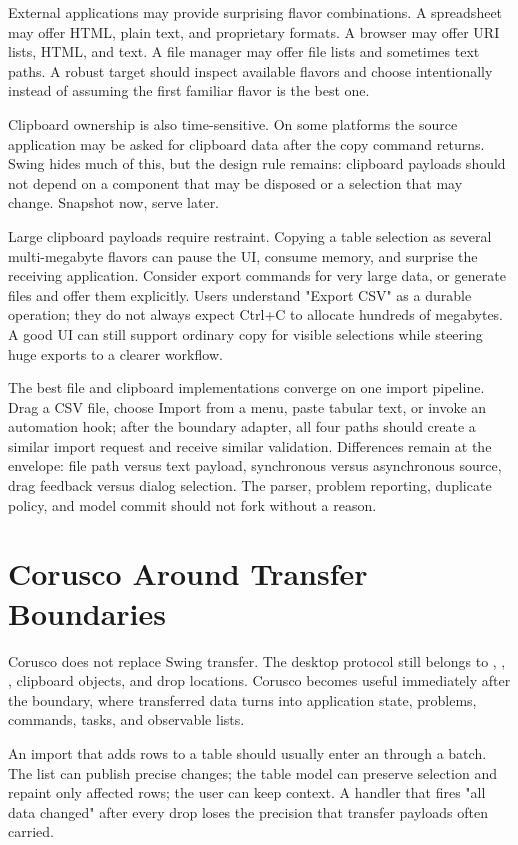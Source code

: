 External applications may provide surprising flavor combinations. A spreadsheet may offer HTML, plain text, and proprietary formats. A browser may offer URI lists, HTML, and text. A file manager may offer file lists and sometimes text paths. A robust target should inspect available flavors and choose intentionally instead of assuming the first familiar flavor is the best one.

Clipboard ownership is also time-sensitive. On some platforms the source application may be asked for clipboard data after the copy command returns. Swing hides much of this, but the design rule remains: clipboard payloads should not depend on a component that may be disposed or a selection that may change. Snapshot now, serve later.

Large clipboard payloads require restraint. Copying a table selection as several multi-megabyte flavors can pause the UI, consume memory, and surprise the receiving application. Consider export commands for very large data, or generate files and offer them explicitly. Users understand "Export CSV" as a durable operation; they do not always expect Ctrl+C to allocate hundreds of megabytes. A good UI can still support ordinary copy for visible selections while steering huge exports to a clearer workflow.

The best file and clipboard implementations converge on one import pipeline. Drag a CSV file, choose Import from a menu, paste tabular text, or invoke an automation hook; after the boundary adapter, all four paths should create a similar import request and receive similar validation. Differences remain at the envelope: file path versus text payload, synchronous versus asynchronous source, drag feedback versus dialog selection. The parser, problem reporting, duplicate policy, and model commit should not fork without a reason.

\section{Corusco Around Transfer Boundaries}

Corusco does not replace Swing transfer. The desktop protocol still belongs to , , , clipboard objects, and drop locations. Corusco becomes useful immediately after the boundary, where transferred data turns into application state, problems, commands, tasks, and observable lists.

An import that adds rows to a table should usually enter an  through a batch. The list can publish precise changes; the table model can preserve selection and repaint only affected rows; the user can keep context. A handler that fires "all data changed" after every drop loses the precision that transfer payloads often carried.

